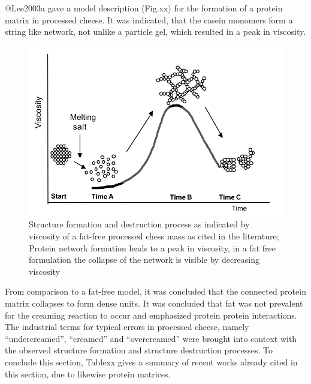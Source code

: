 \documentclass[
]{article}
\begin{document}
@Lee2003a gave a model description (Fig.xx) for the formation of a
protein matrix in processed cheese. It was indicated, that the casein
monomers form a string like network, not unlike a particle gel, which
resulted in a peak in viscosity.

\begin{figure}
\includegraphics[width=0.5\linewidth]{images/str.frm_Lee} \caption{Structure formation and destruction process as indicated by viscosity of a fat-free processed chess mass as cited in the literature; Protein network formation leads to a peak in viscosity, in a fat free formulation the collapse of the network is visible by decreasing viscosity}\label{fig:unnamed-chunk-13}
\end{figure}

From comparison to a fat-free model, it was concluded that the connected
protein matrix collapses to form dense units. It was concluded that fat
was not prevalent for the creaming reaction to occur and emphasized
protein protein interactions. The industrial terms for typical errors in
processed cheese, namely ``undercreamed'', ``creamed'' and
``overcreamed'' were brought into context with the observed structure
formation and structure destruction processes. To conclude this section,
Tablexx gives a summary of recent works already cited in this section,
due to likewise protein matrices.
\end{document}
